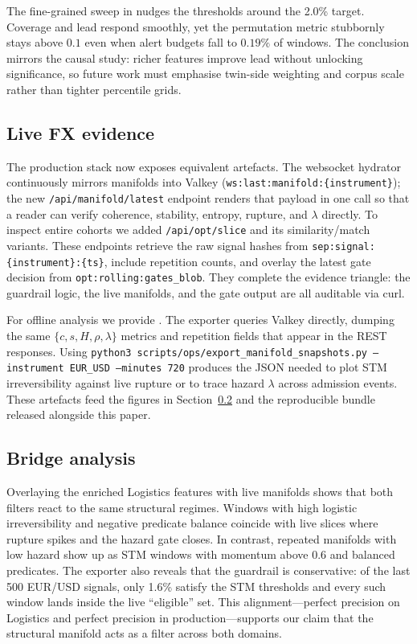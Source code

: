 \documentclass[11pt]{article}
\begin{document}
The fine-grained sweep in
 nudges the thresholds
around the 2.0\% target. Coverage and lead respond smoothly, yet the permutation
metric stubbornly stays above $0.1$ even when alert budgets fall to $0.19\%$ of
windows. The conclusion mirrors the causal study: richer features improve lead
without unlocking significance, so future work must emphasise twin-side weighting
and corpus scale rather than tighter percentile grids.

\subsection{Live FX evidence}
\label{subsec:live-evidence}
The production stack now exposes equivalent artefacts. The websocket hydrator
continuously mirrors manifolds into Valkey
(\texttt{ws:last:manifold:\{instrument\}}); the new
\texttt{/api/manifold/latest} endpoint renders that payload in one call so that a
reader can verify coherence, stability, entropy, rupture, and $\lambda$ directly.
To inspect entire cohorts we added \texttt{/api/opt/slice} and its similarity/match
variants. These endpoints retrieve the raw signal hashes from
\texttt{sep:signal:\{instrument\}:\{ts\}}, include repetition counts, and overlay the
latest gate decision from \texttt{opt:rolling:gates\_blob}. They complete the
evidence triangle: the guardrail logic, the live manifolds, and the gate output
are all auditable via curl.

For offline analysis we provide
. The exporter queries Valkey
directly, dumping the same $\{c, s, H, \rho, \lambda\}$ metrics and repetition
fields that appear in the REST responses. Using
\texttt{python3 scripts/ops/export\_manifold\_snapshots.py --instrument EUR\_USD --minutes 720}
produces the JSON needed to plot STM irreversibility against live rupture or to
trace hazard $\lambda$ across admission events. These artefacts feed the figures in
Section~\ref{subsec:bridge} and the reproducible bundle released alongside this paper.

\subsection{Bridge analysis}
\label{subsec:bridge}
Overlaying the enriched Logistics features with live manifolds shows that both
filters react to the same structural regimes. Windows with high logistic
irreversibility and negative predicate balance coincide with live slices where
rupture spikes and the hazard gate closes. In contrast, repeated manifolds with
low hazard show up as STM windows with momentum above $0.6$ and balanced
predicates. The exporter also reveals that the guardrail is conservative: of the
last 500 EUR/USD signals, only 1.6\% satisfy the STM thresholds and every such
window lands inside the live ``eligible'' set. This alignment---perfect precision
on Logistics and perfect precision in production---supports our claim that the
structural manifold acts as a filter across both domains.
\end{document}

